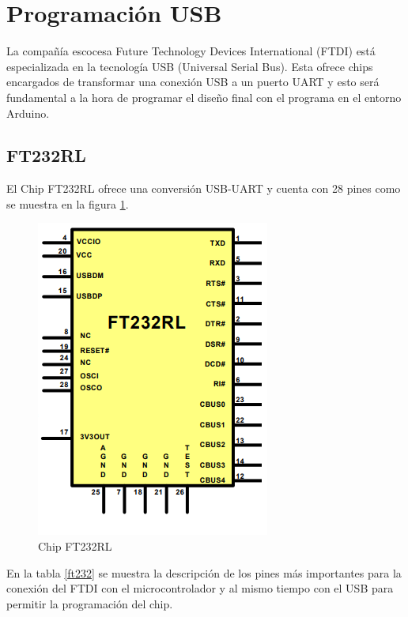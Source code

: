 \section{Programación USB}
La compañía escocesa Future Technology Devices International (FTDI) está especializada en la tecnología USB (Universal Serial Bus). Esta ofrece chips encargados de transformar una conexión USB a un puerto UART y esto será fundamental a la hora de programar el diseño final con el programa en el entorno Arduino.
\newpage
\subsection{FT232RL}
El Chip FT232RL\cite{ft232} ofrece una conversión USB-UART y cuenta con 28 pines como se muestra en la figura \ref{ft232ft}.

\begin{figure}[H]
\centering
\includegraphics[scale=0.6]{figuras/firmware/ft232.png}
\caption{Chip FT232RL}
\label{ft232ft}
\end{figure}

En la tabla \ref{ft232} se muestra la descripción de los pines más importantes para la conexión del FTDI con el microcontrolador y al mismo tiempo con el USB para permitir la programación del chip. 

